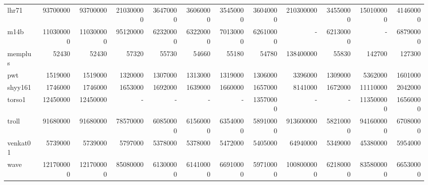 \begin{table}[h]
{{\begin{tabular}{|l|r|r|r|r|r|r|r|r|r|r|r|}
lhr71 & 93700000 & 93700000 & 210300000 & 36470000 & 36060000 & 35450000 & 36040000 & 210300000 & 34550000 & 150100000 & 41460000 \\
m14b & 110300000 & 110300000 & 95120000 & 62320000 & 63220000 & 70130000 & 62610000 & - & 62130000 & - & 68790000 \\
memplus & 52430 & 52430 & 57320 & 55730 & 54660 & 55180 & 54780 & 138400000 & 55830 & 142700 & 127300 \\
pwt & 1519000 & 1519000 & 1320000 & 1307000 & 1313000 & 1319000 & 1306000 & 3396000 & 1309000 & 5362000 & 1601000 \\
shyy161 & 1746000 & 1746000 & 1653000 & 1692000 & 1639000 & 1660000 & 1657000 & 8141000 & 1672000 & 11110000 & 2042000 \\
torso1 & 12450000 & 12450000 & - & - & - & - & 13570000 & - & - & 113500000 & 16560000 \\
troll & 91680000 & 91680000 & 78570000 & 60850000 & 61560000 & 63540000 & 58910000 & 913600000 & 58210000 & 941600000 & 67080000 \\
venkat01 & 5739000 & 5739000 & 5797000 & 5378000 & 5378000 & 5472000 & 5405000 & 64940000 & 5349000 & 45380000 & 5954000 \\
wave & 121700000 & 121700000 & 85080000 & 61300000 & 61410000 & 66910000 & 59710000 & 1008000000 & 62180000 & 835800000 & 66530000 \\
\hline
\end{tabular}%
}%
}
\end{table}







